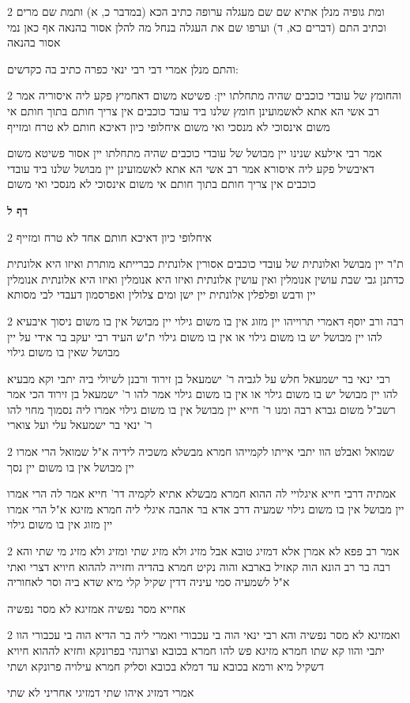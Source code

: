 \documentclass[12pt, openany]{book}
\newcommand{\sethebfont}{
\fontsize{10.5pt}{21.0pt} \selectfont
}
\newcommand{\twocol}[1]{
	{\sethebfont \begin{multicols}{2}
			#1
	\end{multicols}}	
}
\newcommand{\sectname}{}
\newcommand{\newsection}[1]{
	\addcontentsline{toc}{section}{#1}
	\renewcommand{\sectname}{#1}	
	\vspace{-\baselineskip}
	\begin{center}
		\textbf{%
\fontsize{16pt}{16pt}\selectfont
			#1}
	\end{center}
	\vspace{-\baselineskip}
	\nopagebreak
}
\begin{document}
\twocol{ומת גופיה מנלן אתיא שם שם מעגלה ערופה כתיב הכא (במדבר כ, א) ותמת שם מרים וכתיב התם (דברים כא, ד) וערפו שם את העגלה בנחל מה להלן אסור בהנאה אף כאן נמי אסור בהנאה
\par והתם מנלן אמרי דבי רבי ינאי כפרה כתיב בה כקדשים:}
\twocol{והחומץ של עובדי כוכבים שהיה מתחלתו יין: פשיטא משום דאחמיץ פקע ליה איסוריה אמר רב אשי הא אתא לאשמועינן חומץ שלנו ביד עובד כוכבים אין צריך חותם בתוך חותם אי משום אינסוכי לא מנסכי ואי משום איחלופי כיון דאיכא חותם לא טרח ומזייף
\par אמר רבי אילעא שנינו יין מבושל של עובדי כוכבים שהיה מתחלתו יין אסור פשיטא משום דאיבשיל פקע ליה איסורא אמר רב אשי הא אתא לאשמועינן יין מבושל שלנו ביד עובדי כוכבים אין צריך חותם בתוך חותם אי משום אינסוכי לא מנסכי ואי משום}
\newsection{דף ל}
\twocol{איחלופי כיון דאיכא חותם אחד לא טרח ומזייף
\par ת"ר יין מבושל ואלונתית של עובדי כוכבים אסורין אלונתית כברייתא מותרת ואיזו היא אלונתית כדתנן גבי שבת עושין אנומלין ואין עושין אלונתית ואיזו היא אנומלין ואיזו היא אלונתית אנומלין יין ודבש ופלפלין אלונתית יין ישן ומים צלולין ואפרסמון דעבדי לבי מסותא}
\twocol{רבה ורב יוסף דאמרי תרוייהו יין מזוג אין בו משום גילוי יין מבושל אין בו משום ניסוך איבעיא להו יין מבושל יש בו משום גילוי או אין בו משום גילוי ת"ש העיד רבי יעקב בר אידי על יין מבושל שאין בו משום גילוי
\par רבי ינאי בר ישמעאל חלש על לגביה ר' ישמעאל בן זירוד ורבנן לשיולי ביה יתבי וקא מבעיא להו יין מבושל יש בו משום גילוי או אין בו משום גילוי אמר להו ר' ישמעאל בן זירוד הכי אמר רשב"ל משום גברא רבה ומנו ר' חייא יין מבושל אין בו משום גילוי אמרו ליה נסמוך מחוי להו ר' ינאי בר ישמעאל עלי ועל צוארי}
\twocol{שמואל ואבלט הוו יתבי אייתו לקמייהו חמרא מבשלא משכיה לידיה א"ל שמואל הרי אמרו יין מבושל אין בו משום יין נסך
\par אמתיה דרבי חייא איגלויי לה ההוא חמרא מבשלא אתיא לקמיה דר' חייא אמר לה הרי אמרו יין מבושל אין בו משום גילוי שמעיה דרב אדא בר אהבה איגלי ליה חמרא מזיגא א"ל הרי אמרו יין מזוג אין בו משום גילוי}
\twocol{אמר רב פפא לא אמרן אלא דמזיג טובא אבל מזיג ולא מזיג שתי ומזיג ולא מזיג מי שתי והא רבה בר רב הונא הוה קאזיל בארבא והוה נקיט חמרא בהדיה וחזייה לההוא חיויא דצרי ואתי א"ל לשמעיה סמי עיניה דדין שקיל קלי מיא שדא ביה וסר לאחוריה
\par אחייא מסר נפשיה אמזיגא לא מסר נפשיה}
\twocol{ואמזיגא לא מסר נפשיה והא רבי ינאי הוה בי עכבורי ואמרי ליה בר הדיא הוה בי עכבורי הוו יתבי והוו קא שתו חמרא מזיגא פש להו חמרא בכובא וצרונהי בפרונקא וחזיא לההוא חיויא דשקיל מיא ורמא בכובא עד דמלא בכובא וסליק חמרא עילויה פרונקא ושתי
\par אמרי דמזיג איהו שתי דמזיגי אחריני לא שתי}
\end{document}

